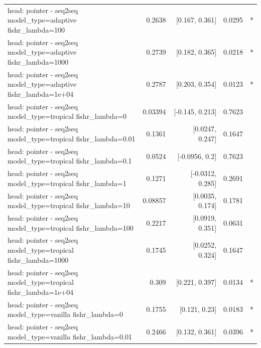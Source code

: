 \documentclass[10pt]{article}
\makeatletter
\newcommand{\stackcell}[1]{\begin{tabular}[t]{@{}l@{}}#1\end{tabular}}
\makeatother
\begin{document}
{\begin{longtable}{lrrrl}
\stackcell{head: pointer - seq2seq\\\footnotesize model\_type=adaptive fishr\_lambda=100 } & 0.2638 & [0.167, 0.361] & 0.0295 & *\\
\stackcell{head: pointer - seq2seq\\\footnotesize model\_type=adaptive fishr\_lambda=1000 } & 0.2739 & [0.182, 0.365] & 0.0218 & *\\
\stackcell{head: pointer - seq2seq\\\footnotesize model\_type=adaptive fishr\_lambda=1e+04 } & 0.2787 & [0.203, 0.354] & 0.0123 & *\\
\stackcell{head: pointer - seq2seq\\\footnotesize model\_type=tropical fishr\_lambda=0 } & 0.03394 & [-0.145, 0.213] & 0.7623 & \\
\stackcell{head: pointer - seq2seq\\\footnotesize model\_type=tropical fishr\_lambda=0.01 } & 0.1361 & [0.0247, 0.247] & 0.1647 & \\
\stackcell{head: pointer - seq2seq\\\footnotesize model\_type=tropical fishr\_lambda=0.1 } & 0.0524 & [-0.0956, 0.2] & 0.7623 & \\
\stackcell{head: pointer - seq2seq\\\footnotesize model\_type=tropical fishr\_lambda=1 } & 0.1271 & [-0.0312, 0.285] & 0.2691 & \\
\stackcell{head: pointer - seq2seq\\\footnotesize model\_type=tropical fishr\_lambda=10 } & 0.08857 & [0.0035, 0.174] & 0.1781 & \\
\stackcell{head: pointer - seq2seq\\\footnotesize model\_type=tropical fishr\_lambda=100 } & 0.2217 & [0.0919, 0.351] & 0.0631 & \\
\stackcell{head: pointer - seq2seq\\\footnotesize model\_type=tropical fishr\_lambda=1000 } & 0.1745 & [0.0252, 0.324] & 0.1647 & \\
\stackcell{head: pointer - seq2seq\\\footnotesize model\_type=tropical fishr\_lambda=1e+04 } & 0.309 & [0.221, 0.397] & 0.0134 & *\\
\stackcell{head: pointer - seq2seq\\\footnotesize model\_type=vanilla fishr\_lambda=0 } & 0.1755 & [0.121, 0.23] & 0.0183 & *\\
\stackcell{head: pointer - seq2seq\\\footnotesize model\_type=vanilla fishr\_lambda=0.01 } & 0.2466 & [0.132, 0.361] & 0.0396 & *\\

\end{longtable}}
\end{document}
